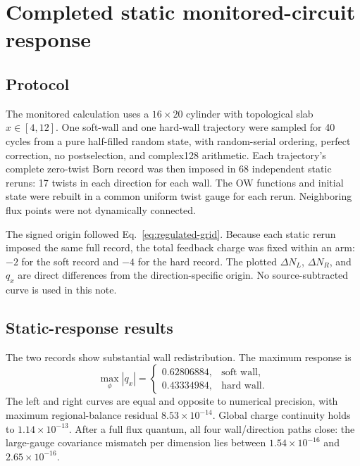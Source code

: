 \documentclass[aps,prb,twocolumn,floatfix,nofootinbib,superscriptaddress]{revtex4-2}
\begin{document}
\section{Completed static monitored-circuit response}

\subsection{Protocol}

The monitored calculation uses a $16\times20$ cylinder with topological slab
$x\in[4,12]$.  One soft-wall and one hard-wall trajectory were sampled for 40
cycles from a pure half-filled random state, with random-serial ordering,
perfect correction, no postselection, and complex128 arithmetic.  Each
trajectory's complete zero-twist Born record was then imposed in 68
independent static reruns: 17 twists in each direction for each wall.  The OW
functions and initial state were rebuilt in a common uniform twist gauge for
each rerun.  Neighboring flux points were not dynamically connected.

The signed origin followed Eq.~\eqref{eq:regulated-grid}.  Because each static
rerun imposed the same full record, the total feedback charge was fixed within
an arm: $-2$ for the soft record and $-4$ for the hard record.  The plotted
$\Delta N_L$, $\Delta N_R$, and $q_x$ are direct differences from the
direction-specific origin.  No source-subtracted curve is used in this note.

\subsection{Static-response results}

The two records show substantial wall redistribution.  The maximum response
is
\begin{equation}
  \max_\phi|q_x|=
  \begin{cases}
    0.62806884,&\text{soft wall},\\
    0.43334984,&\text{hard wall}.
  \end{cases}
\end{equation}
The left and right curves are equal and opposite to numerical precision, with
maximum regional-balance residual $8.53\times10^{-14}$.  Global charge
continuity holds to $1.14\times10^{-13}$.  After a full flux quantum, all four
wall/direction paths close: the large-gauge covariance mismatch per dimension
lies between $1.54\times10^{-16}$ and $2.65\times10^{-16}$.
\end{document}
